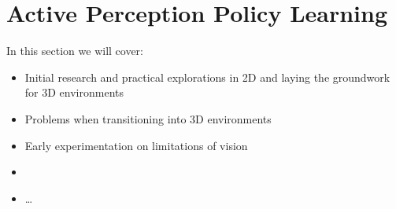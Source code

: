\chapter{Active Perception Policy Learning}
In this section we will cover:
  \begin{itemize}
    \item Initial research and practical explorations in 2D and laying the groundwork for 3D environments
    \item Problems when transitioning into 3D environments
    \item Early experimentation on limitations of vision
    \item 
    \item \ldots
  \end{itemize}



